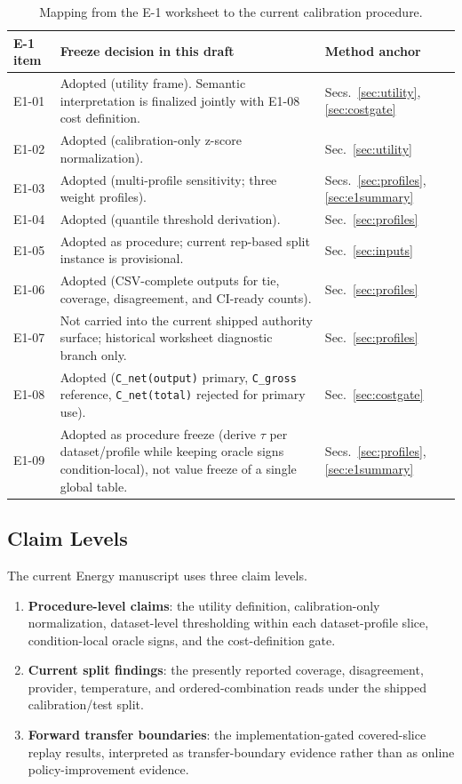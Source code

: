 \documentclass[11pt,a4paper]{article}
\begin{document}
\begin{table}[ht]
\centering
\small
\begin{tabularx}{\textwidth}{@{}lXl@{}}
\toprule
E-1 item & Freeze decision in this draft & Method anchor \\
\midrule
E1-01 & Adopted (utility frame). Semantic interpretation is finalized jointly with E1-08 cost definition. & Secs.~\ref{sec:utility}, \ref{sec:costgate} \\
E1-02 & Adopted (calibration-only z-score normalization). & Sec.~\ref{sec:utility} \\
E1-03 & Adopted (multi-profile sensitivity; three weight profiles). & Secs.~\ref{sec:profiles}, \ref{sec:e1summary} \\
E1-04 & Adopted (quantile threshold derivation). & Sec.~\ref{sec:profiles} \\
E1-05 & Adopted as procedure; current rep-based split instance is provisional. & Sec.~\ref{sec:inputs} \\
E1-06 & Adopted (CSV-complete outputs for tie, coverage, disagreement, and CI-ready counts). & Sec.~\ref{sec:profiles} \\
E1-07 & Not carried into the current shipped authority surface; historical worksheet diagnostic branch only. & Sec.~\ref{sec:profiles} \\
E1-08 & Adopted (\texttt{C\_net(output)} primary, \texttt{C\_gross} reference, \texttt{C\_net(total)} rejected for primary use). & Sec.~\ref{sec:costgate} \\
E1-09 & Adopted as procedure freeze (derive $\tau$ per dataset/profile while keeping oracle signs condition-local), not value freeze of a single global table. & Secs.~\ref{sec:profiles}, \ref{sec:e1summary} \\
\bottomrule
\end{tabularx}
\caption{Mapping from the E-1 worksheet to the current calibration procedure.}
\label{tab:e1_map}
\end{table}

\subsection{Claim Levels}
\label{sec:claimlevels}

The current Energy manuscript uses three claim levels.
\begin{enumerate}
  \item \textbf{Procedure-level claims}: the utility definition, calibration-only normalization, dataset-level thresholding within each dataset-profile slice, condition-local oracle signs, and the cost-definition gate.
  \item \textbf{Current split findings}: the presently reported coverage, disagreement, provider, temperature, and ordered-combination reads under the shipped calibration/test split.
  \item \textbf{Forward transfer boundaries}: the implementation-gated covered-slice replay results, interpreted as transfer-boundary evidence rather than as online policy-improvement evidence.
\end{enumerate}
\end{document}
